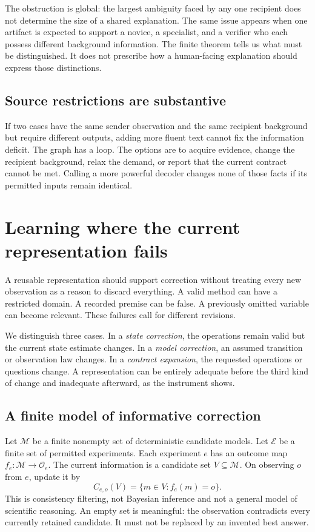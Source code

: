 \documentclass[11pt,letterpaper]{article}
\theoremstyle{plain}
\theoremstyle{definition}
\newcommand{\M}{\mathcal M}\newcommand{\E}{\mathbb E}
\begin{document}
The obstruction is global: the largest ambiguity faced by any one recipient does not determine the size of a shared explanation. The same issue appears when one artifact is expected to support a novice, a specialist, and a verifier who each possess different background information. The finite theorem tells us what must be distinguished. It does not prescribe how a human-facing explanation should express those distinctions.

\subsection{Source restrictions are substantive}
If two cases have the same sender observation and the same recipient background but require different outputs, adding more fluent text cannot fix the information deficit. The graph has a loop. The options are to acquire evidence, change the recipient background, relax the demand, or report that the current contract cannot be met. Calling a more powerful decoder changes none of those facts if its permitted inputs remain identical.


\section{Learning where the current representation fails}\label{sec:revision}
A reusable representation should support correction without treating every new observation as a reason to discard everything. A valid method can have a restricted domain. A recorded premise can be false. A previously omitted variable can become relevant. These failures call for different revisions.

We distinguish three cases. In a \emph{state correction}, the operations remain valid but the current state estimate changes. In a \emph{model correction}, an assumed transition or observation law changes. In a \emph{contract expansion}, the requested operations or questions change. A representation can be entirely adequate before the third kind of change and inadequate afterward, as the instrument shows.

\subsection{A finite model of informative correction}
Let $\M$ be a finite nonempty set of deterministic candidate models. Let $\mathcal E$ be a finite set of permitted experiments. Each experiment $e$ has an outcome map $f_e:\M\to\mathcal O_e$. The current information is a candidate set $V\subseteq\M$. On observing $o$ from $e$, update it by
\begin{equation}\label{eq:filter}
C_{e,o}(V)=\{m\in V:f_e(m)=o\}.
\end{equation}
This is consistency filtering, not Bayesian inference and not a general model of scientific reasoning. An empty set is meaningful: the observation contradicts every currently retained candidate. It must not be replaced by an invented best answer.
\end{document}
